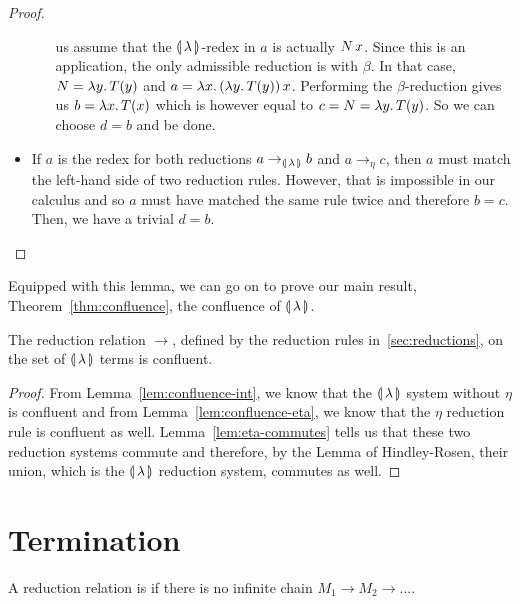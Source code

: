 \begin{proof}
\begin{itemize}
\begin{itemize}
      us assume that the $\llparenthesis \, \lambda \, \rrparenthesis$-redex in $a$ is actually
      $N\,x$. Since this is an application, the only admissible
      reduction is with $\beta$. In that case, $N = \lambda y.\, T(y)$ and
      $a = \lambda x.\, (\lambda y.\, T(y))\,x$. Performing the
      $\beta$-reduction gives us $b = \lambda x.\, T(x)$ which is however equal
      to $c = N = \lambda y.\, T(y)$. So we can choose $d = b$ and be done.
    \end{itemize}
  \item If $a$ is the redex for both reductions $a \to_{\llparenthesis \, \lambda \, \rrparenthesis} b$ and
    $a \to_\eta c$, then $a$ must match the left-hand side of two reduction
    rules. However, that is impossible in our calculus and so $a$ must have
    matched the same rule twice and therefore $b = c$. Then, we have a
    trivial $d = b$.
  \end{itemize}
\end{proof}

Equipped with this lemma, we can go on to prove our main result,
Theorem~\ref{thm:confluence}, the confluence of $\llparenthesis \, \lambda \, \rrparenthesis$.

\begin{theorem}\label{thm:confluence}
  
  The reduction relation $\to$, defined by the reduction rules
  in~\ref{sec:reductions}, on the set of $\llparenthesis \, \lambda \, \rrparenthesis$ terms is
  confluent.
\end{theorem}

\begin{proof}
  From Lemma~\ref{lem:confluence-int}, we know that the $\llparenthesis \, \lambda \, \rrparenthesis$
  system without $\eta$ is confluent and from
  Lemma~\ref{lem:confluence-eta}, we know that the $\eta$ reduction
  rule is confluent as well. Lemma~\ref{lem:eta-commutes} tells us that
  these two reduction systems commute and therefore, by the Lemma of
  Hindley-Rosen, their union, which is the $\llparenthesis \, \lambda \, \rrparenthesis$ reduction
  system, commutes as well.
\end{proof}


\section{Termination}
\label{sec:termination}

\begin{definition}
  A reduction relation is  if there is no infinite chain
  $M_1 \to M_2 \to \ldots$.
\end{definition}

